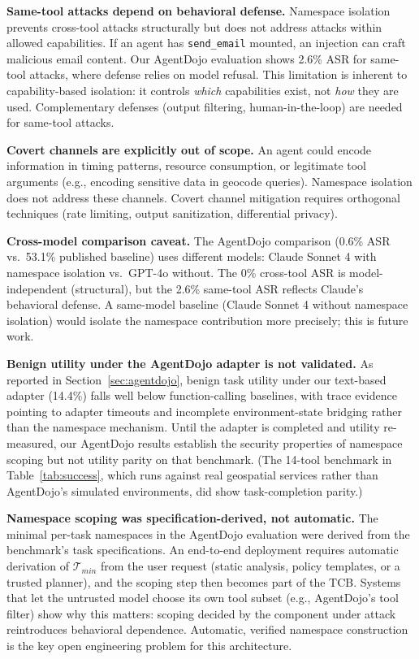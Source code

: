 \documentclass[acmsmall,screen,review]{acmart}
\begin{document}
\textbf{Same-tool attacks depend on behavioral defense.} Namespace isolation prevents cross-tool attacks structurally but does not address attacks within allowed capabilities. If an agent has \texttt{send\_email} mounted, an injection can craft malicious email content. Our AgentDojo evaluation shows 2.6\% ASR for same-tool attacks, where defense relies on model refusal. This limitation is inherent to capability-based isolation: it controls \textit{which} capabilities exist, not \textit{how} they are used. Complementary defenses (output filtering, human-in-the-loop) are needed for same-tool attacks.

\textbf{Covert channels are explicitly out of scope.} An agent could encode information in timing patterns, resource consumption, or legitimate tool arguments (e.g., encoding sensitive data in geocode queries). Namespace isolation does not address these channels. Covert channel mitigation requires orthogonal techniques (rate limiting, output sanitization, differential privacy).

\textbf{Cross-model comparison caveat.} The AgentDojo comparison (0.6\% ASR vs.\ 53.1\% published baseline) uses different models: Claude Sonnet 4 with namespace isolation vs.\ GPT-4o without. The 0\% cross-tool ASR is model-independent (structural), but the 2.6\% same-tool ASR reflects Claude's behavioral defense. A same-model baseline (Claude Sonnet 4 without namespace isolation) would isolate the namespace contribution more precisely; this is future work.

\textbf{Benign utility under the AgentDojo adapter is not validated.} As reported in Section~\ref{sec:agentdojo}, benign task utility under our text-based adapter (14.4\%) falls well below function-calling baselines, with trace evidence pointing to adapter timeouts and incomplete environment-state bridging rather than the namespace mechanism. Until the adapter is completed and utility re-measured, our AgentDojo results establish the security properties of namespace scoping but not utility parity on that benchmark. (The 14-tool benchmark in Table~\ref{tab:success}, which runs against real geospatial services rather than AgentDojo's simulated environments, did show task-completion parity.)

\textbf{Namespace scoping was specification-derived, not automatic.} The minimal per-task namespaces in the AgentDojo evaluation were derived from the benchmark's task specifications. An end-to-end deployment requires automatic derivation of $\mathcal{T}_{min}$ from the user request (static analysis, policy templates, or a trusted planner), and the scoping step then becomes part of the TCB. Systems that let the untrusted model choose its own tool subset (e.g., AgentDojo's tool filter) show why this matters: scoping decided by the component under attack reintroduces behavioral dependence. Automatic, verified namespace construction is the key open engineering problem for this architecture.
\end{document}
